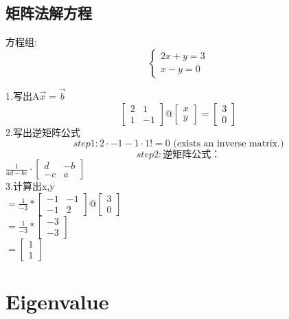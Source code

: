 \documentclass[12pt]{article}
\begin{document}
\subsection*{矩阵法解方程}
\begin{flushleft}
 方程组:
    \[
     \begin{cases}
        2x + y  = 3 \\
        x - y = 0 
     \end{cases}
     \]

1.写出A$\vec{x} = \vec{b}$
\[
\begin{bmatrix}
    2 & 1 \\
    1 & -1 
\end{bmatrix} @ \begin{bmatrix}
    x \\
    y
\end{bmatrix} = \begin{bmatrix}
    3 \\ 
    0
\end{bmatrix} 
\]
2.写出逆矩阵公式
\[
step1:
  2 \cdot -1 - 1 \cdot1 != 0  \text{ (exists an inverse matrix.)} 
\]
\[
  step2:
  \text{逆矩阵公式：}
\] 
$\frac{1}{ad - bc}\cdot \begin{bmatrix}
    d & -b \\
    -c & a
\end{bmatrix}$ \\ 

3.计算出x,y \\
$
= \frac{1}{-3} * \begin{bmatrix}
    -1 & -1 \\ 
    -1 & 2
\end{bmatrix} @ \begin{bmatrix}
    3 \\ 
    0
\end{bmatrix}
$\\
$
=  \frac{1}{-3} * \begin{bmatrix}
    -3 \\
    -3
\end{bmatrix}
$\\
$
= \begin{bmatrix}
    1 \\
    1
\end{bmatrix}
$
\end{flushleft}

\section*{Eigenvalue}
\end{document}

